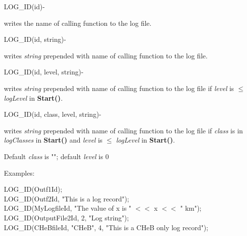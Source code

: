 \hfill
\begin{minipage}{\dimexpr\textwidth-2em}

        \medskip
        \begin{minipage}[t][][b]{14.0em}LOG\_ID(id)\hfill{-}\end{minipage}
        \begin{minipage}[t][][b]{\dimexpr\textwidth-14.2em}
            writes the name of calling function to the log file.
        \end{minipage}\vfill

        \medskip
        \begin{minipage}[t][][b]{14.0em}LOG\_ID(id, string)\hfill{-}\end{minipage}
        \begin{minipage}[t][][b]{\dimexpr\textwidth-14.2em}
            writes \textit{string} prepended with name of calling function to the log file.
        \end{minipage}\vfill

        \medskip
        \begin{minipage}[t][][b]{14.0em}LOG\_ID(id, level, string)\hfill{-}\end{minipage}
        \begin{minipage}[t][][b]{\dimexpr\textwidth-14.2em}
            writes \textit{string} prepended with name of calling function to the log file if \textit{level} is $\leq$ \textit{logLevel} in \textbf{Start()}.
        \end{minipage}\vfill

        \medskip
        \begin{minipage}[t][][b]{14.0em}LOG\_ID(id, class, level, string)\hfill{-}\end{minipage}
        \begin{minipage}[t][][b]{\dimexpr\textwidth-14.2em}
            writes \textit{string} prepended with name of calling function to the log file if \textit{class} is in \textit{logClasses} in \textbf{Start()} and \textit{level} is $\leq$ \textit{logLevel} in \textbf{Start()}.
        \end{minipage}\vfill

    \medskip
    Default \textit{class} is ""; default \textit{level} is 0

    \medskip
    Examples:

    \medskip
    \tabto{3em}LOG\_ID(Outf1Id); \\
    \tabto{3em}LOG\_ID(Outf2Id, "This is a log record"); \\
    \tabto{3em}LOG\_ID(MyLogfileId, "The value of x is " $<<$ x $<<$ " km"); \\
    \tabto{3em}LOG\_ID(OutputFile2Id, 2, "Log string"); \\
    \tabto{3em}LOG\_ID(CHeBfileId, "CHeB", 4, "This is a CHeB only log record");
\end{minipage}
 
